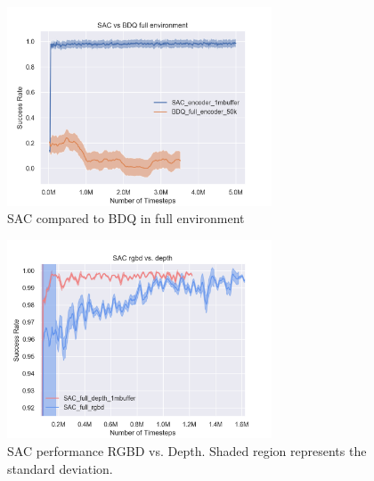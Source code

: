 \begin{figure}[!htbp]
    \centering
        \includegraphics[width=0.7\textwidth]{figures/SACfull/SAC_vs_BDQ_full_environment}
    \caption{SAC compared to BDQ in full environment}
    \label{fig:bdq}
\end{figure}

\begin{figure}[!htbp]
    \centering
        \includegraphics[width=0.7\textwidth]{figures/SACfull/SAC_rgbd_vs_depth}
    \caption{SAC performance RGBD vs. Depth. Shaded region represents the standard deviation.}
    \label{fig:depthvsrgbd}
\end{figure}
